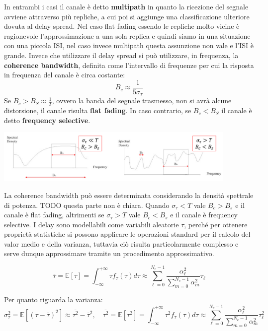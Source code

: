 In entrambi i casi il canale è detto \textbf{multipath} in quanto la ricezione del segnale avviene attraverso più repliche, a cui poi si aggiunge una classificazione ulteriore dovuta al delay spread.
Nel caso flat fading essendo le repliche molto vicine è ragionevole l'approssimazione a una sola replica e quindi siamo in una situazione con una piccola ISI, nel caso invece multipath questa assunzione non vale e l'ISI è grande.
Invece che utilizzare il delay spread si può utilizzare, in frequenza, la \textbf{coherence bandwidth}, definita come l'intervallo di frequenze per cui la risposta in frequenza del canale è circa costante:
\[
    B_c \approx \frac{1}{5\sigma_\tau}
\]
Se $B_c > B_S \approx \frac{1}{T}$, ovvero la banda del segnale trasmesso, non si avrà alcune distorsione, il canale risulta \textbf{flat fading}. In caso contrario, se $B_c < B_S$ il canale è detto \textbf{frequency selective}.
\begin{center}
    \includegraphics[width=0.875\textwidth]{imgs/coherence_bandwidth.png}
\end{center}
La coherence bandwidth può essere determinata considerando la densità spettrale di potenza.
TODO questa parte non è chiara.
Quando $\sigma_{\tau} < T$ vale $B_c > B_s$ e il canale è flat fading, altrimenti se $\sigma_{\tau} > T$ vale $B_c < B_s$ e il canale è frequency selective.
I delay sono modellabili come variabili aleatorie $\tau$, perché per ottenere proprietà statistiche si possono applicare le operazioni standard per il calcolo del valor medio e della varianza, tuttavia ciò risulta particolarmente complesso e serve dunque approssimare tramite un procedimento approssimativo.


\[
    \overline{\tau} = \mathbb{E} \left[\tau\right] = \int_{-\infty}^{+\infty} \tau f_{\tau}(\tau) d\tau \approx \sum_{\ell=0}^{N_c-1} \frac{\alpha_{\ell}^2}{\sum_{m=0}^{N_c-1} \alpha_{m}^2} \tau_{\ell}
\]

Per quanto riguarda la varianza:
\[
    \sigma_\tau^2 = \mathbb{E}\left[({\tau - \overline{\tau}})^2\right] \approx \overline{\tau^2} - \overline{\tau}^2, \quad \overline{\tau^2} = \mathbb{E} \left[\tau^2\right] = \int_{-\infty}^{+\infty} \tau^2 f_{\tau}(\tau) d\tau \approx \sum_{\ell=0}^{N_c-1} \frac{\alpha_{\ell}^2}{\sum_{m=0}^{N_c-1} \alpha_{m}^2} \tau_{\ell}^2
\]

